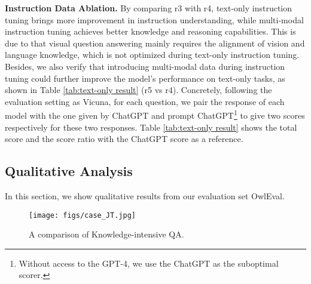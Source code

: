 \documentclass{article}
\newcommand{\evalsetname}{OwlEval\xspace}
\begin{document}
\noindent\textbf{Instruction Data Ablation.}
By comparing r3 with r4, text-only instruction tuning brings more improvement in instruction understanding, while multi-modal instruction tuning achieves better knowledge and reasoning capabilities. This is due to that visual question answering mainly requires the alignment of vision and language knowledge, which is not optimized during text-only instruction tuning. Besides, we also verify that introducing multi-modal data during instruction tuning could further improve the model's performance on text-only tasks, as shown in Table \ref{tab:text-only result} (r5 vs r4). Concretely, following the evaluation setting as Vicuna\citep{vicuna}, for each question, we pair the response of each model with the one given by ChatGPT and prompt ChatGPT\footnote{Without access to the GPT-4, we use the ChatGPT as the suboptimal scorer.} to give two scores respectively for these two responses. Table \ref{tab:text-only result} shows the total score and the score ratio with the ChatGPT score as a reference. 







\begin{table*}[t]
\centering
{}
\caption{The performance of 80 text-only questions from Vicuna\citep{vicuna} assessed by ChatGPT. }
\label{tab:text-only result}
\end{table*}




\subsection{Qualitative Analysis}



In this section, we show qualitative results from our evaluation set \evalsetname.

\begin{figure}[!ht]
    \centering
    \texttt{[image: figs/case\_JT.jpg]}
    \caption{A comparison of Knowledge-intensive QA.}
    \label{fig:case_JT}
    \vspace{-2mm}
\end{figure}
\end{document}
